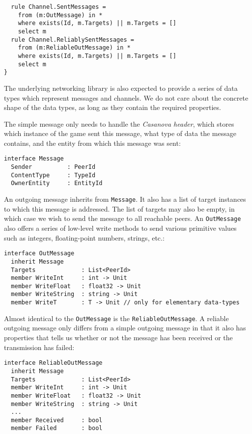 \begin{lstlisting}
  rule Channel.SentMessages = 
    from (m:OutMessage) in *
    where exists(Id, m.Targets) || m.Targets = []
    select m
  rule Channel.ReliablySentMessages = 
    from (m:ReliableOutMessage) in *
    where exists(Id, m.Targets) || m.Targets = []
    select m
}
\end{lstlisting}

The underlying networking library is also expected to provide a series of data types which represent messages and channels. We do not care about the concrete shape of the data types, as long as they contain the required properties.

The simple message only needs to handle the \textit{Casanova header}, which stores which instance of the game sent this message, what type of data the message contains, and the entity from which this message was sent:

\begin{lstlisting}
interface Message
  Sender          : PeerId
  ContentType     : TypeId
  OwnerEntity     : EntityId
\end{lstlisting}

An outgoing message inherits from \texttt{Message}. It also has a list of target instances to which this message is addressed. The list of targets may also be empty, in which case we wish to send the message to all reachable peers. An \texttt{OutMessage} also offers a series of low-level write methods to send various primitive values such as integers, floating-point numbers, strings, etc.:

\begin{lstlisting}
interface OutMessage
  inherit Message
  Targets             : List<PeerId>
  member WriteInt     : int -> Unit
  member WriteFloat   : float32 -> Unit
  member WriteString  : string -> Unit
  member WriteT       : T -> Unit // only for elementary data-types
\end{lstlisting}

Almost identical to the \texttt{OutMessage} is the \texttt{ReliableOutMessage}. A reliable outgoing message only differs from a simple outgoing message in that it also has properties that tells us whether or not the message has been received or the transmission has failed:

\begin{lstlisting}
interface ReliableOutMessage
  inherit Message
  Targets             : List<PeerId>
  member WriteInt     : int -> Unit
  member WriteFloat   : float32 -> Unit
  member WriteString  : string -> Unit
  ...
  member Received     : bool
  member Failed       : bool
\end{lstlisting}

